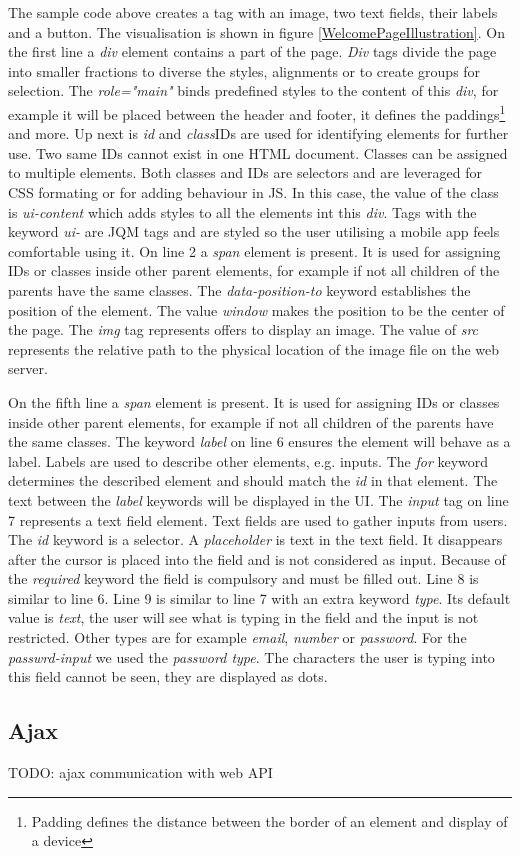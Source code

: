 The sample code above creates a tag with an image, two text fields, their labels and a button. The visualisation is shown in figure \ref{WelcomePageIllustration}. On the first line a \textit{div} element contains a part of the page. \textit{Div} tags divide the page into smaller fractions to diverse the styles, alignments or to create groups for selection. The \textit{role="main"} binds predefined styles to the content of this \textit{div}, for example it will be placed between the header and footer, it defines the paddings\footnote{Padding defines the distance between the border of an element and display of a device} and more. Up next is \textit{id} and \textit{class}IDs are used for identifying elements for further use. Two same IDs cannot exist in one HTML document. Classes can be assigned to multiple elements. Both classes and IDs are selectors and are leveraged for CSS formating or for adding behaviour in JS. In this case, the value of the class is \textit{ui-content} which adds styles to all the elements int this \textit{div}. Tags with the keyword \textit{ui-} are JQM tags and are styled so the user utilising a mobile app feels comfortable using it. On line 2 a \textit{span} element is present. It is used for assigning IDs or classes inside other parent elements, for example if not all children of the parents have the same classes. The \textit{data-position-to} keyword establishes the position of the element. The value \textit{window} makes the position to be the center of the page. The \textit{img} tag represents offers to display an image. The value of \textit{src} represents the relative path to the physical location of the image file on the web server. 


On the fifth line a \textit{span} element is present. It is used for assigning IDs or classes inside other parent elements, for example if not all children of the parents have the same classes. The keyword \textit{label} on line 6 ensures the element will behave as a label. Labels are used to describe other elements, e.g. inputs. The \textit{for} keyword determines the described element and should match the \textit{id} in that element. The text between the \textit{label} keywords will be displayed in the UI. The \textit{input} tag on line 7 represents a text field element. Text fields are used to gather inputs from users. The \textit{id} keyword is a selector. A \textit{placeholder} is text in the text field. It disappears after the cursor is placed into the field and is not considered as input. Because of the \textit{required} keyword the field is compulsory and must be filled out. Line 8 is similar to line 6. Line 9 is similar to line 7 with an extra keyword \textit{type}. Its default value is \textit{text}, the user will see what is typing in the field and the input is not restricted. Other types are for example \textit{email}, \textit{number} or \textit{password}. For the \textit{passwrd-input} we used the \textit{password type}. The characters the user is typing into this field cannot be seen, they are displayed as dots.

\subsection{Ajax}
TODO: ajax communication with web API


